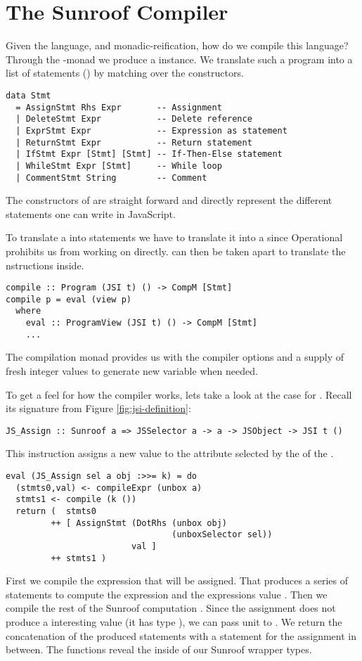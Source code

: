  
\section{The Sunroof Compiler}
\label{sec:compiler}

Given the language, and monadic-reification, how do we compile this language?
Through the \JS-monad we produce a  instance. We 
translate such a program into a list of statements () by matching over 
the \JSI constructors.
\begin{verbatim}
data Stmt 
  = AssignStmt Rhs Expr       -- Assignment
  | DeleteStmt Expr           -- Delete reference
  | ExprStmt Expr             -- Expression as statement
  | ReturnStmt Expr           -- Return statement
  | IfStmt Expr [Stmt] [Stmt] -- If-Then-Else statement
  | WhileStmt Expr [Stmt]     -- While loop
  | CommentStmt String        -- Comment
\end{verbatim}
The constructors of  are straight forward and
directly represent the different statements one can write
in JavaScript.

To translate a  into statements we
have to translate it into a  since 
Operational prohibits us from working on  directly.
 can then be taken apart to translate 
the \JSI nstructions inside.
\begin{verbatim}
compile :: Program (JSI t) () -> CompM [Stmt]
compile p = eval (view p)
  where
    eval :: ProgramView (JSI t) () -> CompM [Stmt]
    ...
\end{verbatim}
The compilation monad  provides us with 
the compiler options and a supply of fresh integer
values to generate new variable when needed.

To get a feel for how the compiler works, lets take a look at 
the case for . Recall its signature from 
Figure \ref{fig:jsi-definition}:
\begin{verbatim}
JS_Assign :: Sunroof a => JSSelector a -> a -> JSObject -> JSI t ()
\end{verbatim}
This instruction assigns a new value  to the attribute
selected by the  of the .
\begin{verbatim}
eval (JS_Assign sel a obj :>>= k) = do
  (stmts0,val) <- compileExpr (unbox a)
  stmts1 <- compile (k ())
  return (  stmts0 
         ++ [ AssignStmt (DotRhs (unbox obj) 
                                 (unboxSelector sel)) 
                         val ] 
         ++ stmts1 )
\end{verbatim}
First we compile the expression that will be assigned. That
produces a series of statements to compute the expression and 
the expressions value .
Then we compile the rest of the Sunroof computation . Since 
the assignment does not produce a interesting value (it has type ),
we can pass unit to .
We return the concatenation of the produced statements with a statement 
for the assignment in between. The  functions reveal the 
 inside of our Sunroof wrapper types.

